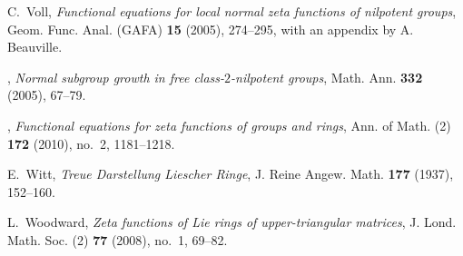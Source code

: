 \documentclass[11pt]{amsart}
\numberwithin{equation}{section}
\numberwithin{figure}{section}
\theoremstyle{plain}
\theoremstyle{definition}
\theoremstyle{remark}
\begin{document}
\begin{thebibliography}{10}
C.~Voll, \emph{{Functional equations for local normal zeta functions of
  nilpotent groups}}, Geom. Func. Anal. (GAFA) \textbf{15} (2005), 274--295,
  with an appendix by A. Beauville.

\bysame, \emph{{Normal subgroup growth in free class-$2$-nilpotent groups}},
  Math. Ann. \textbf{332} (2005), 67--79.

\bysame, \emph{{Functional equations for zeta functions of groups and rings}},
  Ann. of Math. (2) \textbf{172} (2010), no.~2, 1181--1218.

E.~Witt, \emph{Treue {D}arstellung {L}iescher {R}inge}, J. Reine Angew. Math.
  \textbf{177} (1937), 152--160.

L.~Woodward, \emph{Zeta functions of {L}ie rings of upper-triangular matrices},
  J. Lond. Math. Soc. (2) \textbf{77} (2008), no.~1, 69--82.

\end{thebibliography}
\end{document}
